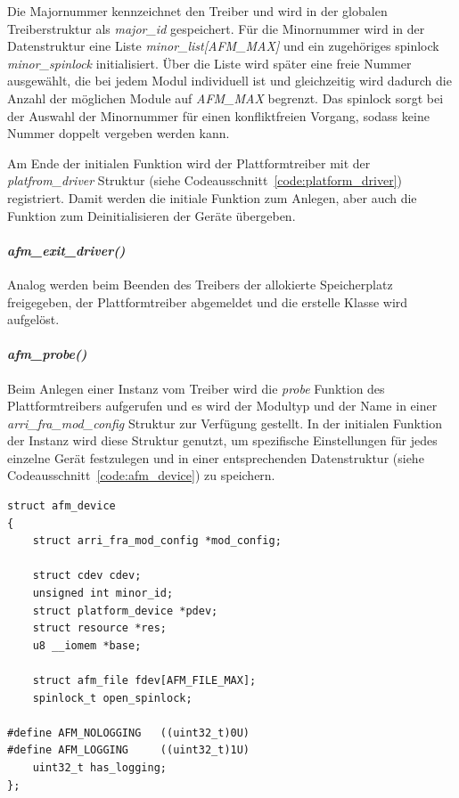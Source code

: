 Die Majornummer kennzeichnet den Treiber und wird in der globalen Treiberstruktur als \textit{major\_id} gespeichert. Für die Minornummer wird in der Datenstruktur eine Liste \textit{minor\_list[AFM\_MAX]} und ein zugehöriges \gls{spinlock} \textit{minor\_spinlock} initialisiert. Über die Liste wird später eine freie Nummer ausgewählt, die bei jedem Modul individuell ist und gleichzeitig wird dadurch die Anzahl der möglichen Module auf \textit{AFM\_MAX} begrenzt. Das \gls{spinlock} sorgt bei der Auswahl der Minornummer für einen konfliktfreien Vorgang, sodass keine Nummer doppelt vergeben werden kann. 


Am Ende der initialen Funktion wird der Plattformtreiber mit der \textit{platfrom\_driver} Struktur (siehe Codeausschnitt~\ref{code:platform_driver}) registriert. Damit werden die initiale Funktion zum Anlegen, aber auch die Funktion zum Deinitialisieren der Geräte übergeben.


\paragraph*{\textit{afm\_exit\_driver()}}
Analog werden beim Beenden des Treibers der allokierte Speicherplatz freigegeben, der Plattformtreiber abgemeldet und die erstelle Klasse wird aufgelöst.


\paragraph*{\textit{afm\_probe()}}
Beim Anlegen einer Instanz vom Treiber wird die \textit{probe} Funktion des Plattformtreibers aufgerufen und es wird der Modultyp und der Name in einer \textit{arri\_fra\_mod\_config} Struktur zur Verfügung gestellt. In der initialen Funktion der Instanz wird diese Struktur genutzt, um spezifische Einstellungen für jedes einzelne Gerät festzulegen und in einer entsprechenden Datenstruktur (siehe Codeausschnitt~\ref{code:afm_device}) zu speichern. 

\begin{lstfloat}
\begin{lstlisting}
struct afm_device 
{
	struct arri_fra_mod_config *mod_config;

	struct cdev cdev;
	unsigned int minor_id;
	struct platform_device *pdev;
	struct resource *res;
	u8 __iomem *base;
	
	struct afm_file fdev[AFM_FILE_MAX];
	spinlock_t open_spinlock;
	
#define AFM_NOLOGGING   ((uint32_t)0U)
#define AFM_LOGGING     ((uint32_t)1U)
	uint32_t has_logging;
};
\end{lstlisting}
\end{lstfloat}

